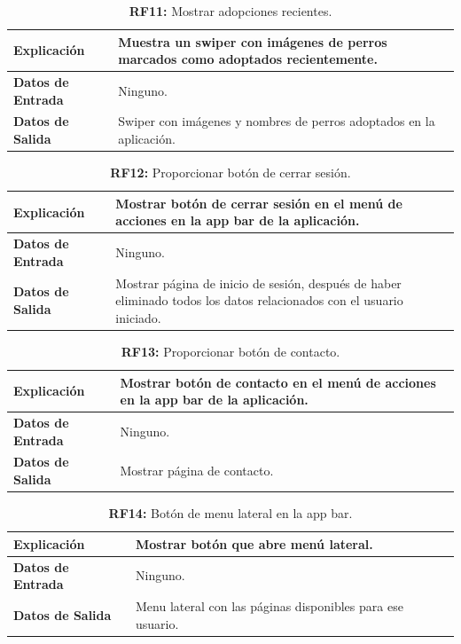 \documentclass[a4paper, 12pt]{article}
\begin{document}
\begin{table}[H]
\captionsetup{justification=raggedright,singlelinecheck=false}
\caption{\textbf{RF11:} Mostrar adopciones recientes.}
\label{tab:RF11}
	\begin{tabular}{|m{5cm}|m{10cm}|}
	\hline
	\textbf{Explicación} & Muestra un swiper con imágenes de perros marcados como adoptados recientemente. \\ 
	\hline
	\textbf{Datos de Entrada} & Ninguno. \\ 
	\hline
	\textbf{Datos de Salida} & Swiper con imágenes y nombres de perros adoptados en la aplicación. \\ 
	\hline
\end{tabular}
\end{table}

\begin{table}[H]
\captionsetup{justification=raggedright,singlelinecheck=false}
\caption{\textbf{RF12:} Proporcionar botón de cerrar sesión.}
\label{tab:RF12}
	\begin{tabular}{|m{5cm}|m{10cm}|}
	\hline
	\textbf{Explicación} & Mostrar botón de cerrar sesión en el menú de acciones en la app bar de la aplicación. \\ 
	\hline
	\textbf{Datos de Entrada} & Ninguno. \\ 
	\hline
	\textbf{Datos de Salida} & Mostrar página de inicio de sesión, después de haber eliminado todos los datos relacionados con el usuario iniciado. \\ 
	\hline
\end{tabular}
\end{table}

\begin{table}[H]
\captionsetup{justification=raggedright,singlelinecheck=false}
\caption{\textbf{RF13:} Proporcionar botón de contacto.}
\label{tab:RF13}
	\begin{tabular}{|m{5cm}|m{10cm}|}
	\hline
	\textbf{Explicación} & Mostrar botón de contacto en el menú de acciones en la app bar de la aplicación. \\ 
	\hline
	\textbf{Datos de Entrada} & Ninguno. \\ 
	\hline
	\textbf{Datos de Salida} & Mostrar página de contacto. \\ 
	\hline
\end{tabular}
\end{table}

\begin{table}[H]
\captionsetup{justification=raggedright,singlelinecheck=false}
\caption{\textbf{RF14:} Botón de menu lateral en la app bar.}
\label{tab:RF14}
	\begin{tabular}{|m{5cm}|m{10cm}|}
	\hline
	\textbf{Explicación} & Mostrar botón que abre menú lateral. \\ 
	\hline
	\textbf{Datos de Entrada} & Ninguno. \\ 
	\hline
	\textbf{Datos de Salida} & Menu lateral con las páginas disponibles para ese usuario. \\ 
	\hline
\end{tabular}
\end{table}
\end{document}
